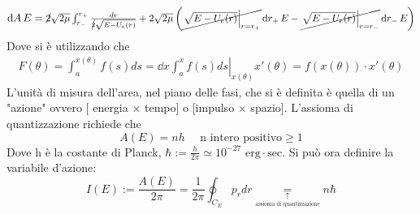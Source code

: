 \documentclass[Main.tex]{subfiles}
\begin{document}
\begin{gather*}
	\dd{A}{E} =\resizebox{1\textwidth}{!}{$ \cancel{2} \sqrt{2 \mu} \int^{r_+}_{r_-} \frac{dr}{\cancel{2} \sqrt{E-U_e(r)}} +2 \sqrt{2 \mu} \left( \cancel{\left. \sqrt{E-U_e(r)} \right|_{r=r_+}} \dd{r_+}{E} - \cancel{\left. \sqrt{E-U_e(r)} \right|_{r=r_-}} \dd{r_-}{E}\right)$}
\end{gather*}
Dove si è utilizzando che 
\begin{gather*}
	F(\theta)= \int_a^{x(\theta)} f(s) ds= \dd{}{x} \left. \int_a ^x  f(s) ds \right|_{x(\theta)} x'(\theta) = f(x(\theta)) \cdot x'(\theta)
\end{gather*}
L'unità di misura dell'area, nel piano delle fasi, che si è definita è quella di un "azione" ovvero [ energia $\times$ tempo] o [impulso $\times$ spazio]. L'assioma di quantizzazione richiede che 
\begin{equation}
	A(E) = n h \ \ \ \ \ \  \text{n intero positivo} \geq 1
\end{equation}
Dove h è la costante di Planck, $\hbar:= \frac{h}{2 \pi} \simeq 10^{-27} \text{ erg} \cdot \text{sec}$. Si può ora definire la variabile d'azione:
\begin{equation}
	I(E):= \frac{A(E)}{2 \pi} = \frac{1}{2 \pi} \oint_{C_E} p_r dr \underset{\underset{\text{assioma di quantizzazione}}{\uparrow}}{=}n \hbar
\end{equation}
\end{document}

